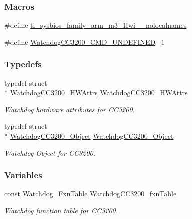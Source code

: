 \subsubsection*{Macros}
\begin{DoxyCompactItemize}
\item 
\#define \hyperlink{_watchdog_c_c3200_8h_aaa17ecf48f5762e2e1bdb0bab8aacf0c}{ti\-\_\-sysbios\-\_\-family\-\_\-arm\-\_\-m3\-\_\-\-Hwi\-\_\-\-\_\-nolocalnames}
\item 
\#define \hyperlink{_watchdog_c_c3200_8h_a6227f12ef4b46a2330900c629e982040}{Watchdog\-C\-C3200\-\_\-\-C\-M\-D\-\_\-\-U\-N\-D\-E\-F\-I\-N\-E\-D}~-\/1
\end{DoxyCompactItemize}
\subsubsection*{Typedefs}
\begin{DoxyCompactItemize}
\item 
typedef struct \\*
\hyperlink{struct_watchdog_c_c3200___h_w_attrs}{Watchdog\-C\-C3200\-\_\-\-H\-W\-Attrs} \hyperlink{_watchdog_c_c3200_8h_a93a2e6a65ad04b5f64ba46a7ad314fa0}{Watchdog\-C\-C3200\-\_\-\-H\-W\-Attrs}
\begin{DoxyCompactList}\small\item\em Watchdog hardware attributes for C\-C3200. \end{DoxyCompactList}\item 
typedef struct \\*
\hyperlink{struct_watchdog_c_c3200___object}{Watchdog\-C\-C3200\-\_\-\-Object} \hyperlink{_watchdog_c_c3200_8h_acac7932b9436e05c5f1a1901739cad15}{Watchdog\-C\-C3200\-\_\-\-Object}
\begin{DoxyCompactList}\small\item\em Watchdog Object for C\-C3200. \end{DoxyCompactList}\end{DoxyCompactItemize}
\subsubsection*{Variables}
\begin{DoxyCompactItemize}
\item 
const \hyperlink{struct_watchdog___fxn_table}{Watchdog\-\_\-\-Fxn\-Table} \hyperlink{_watchdog_c_c3200_8h_aa8da6260d2ca5dbe363e6d82748e9375}{Watchdog\-C\-C3200\-\_\-fxn\-Table}
\begin{DoxyCompactList}\small\item\em Watchdog function table for C\-C3200. \end{DoxyCompactList}\end{DoxyCompactItemize}


